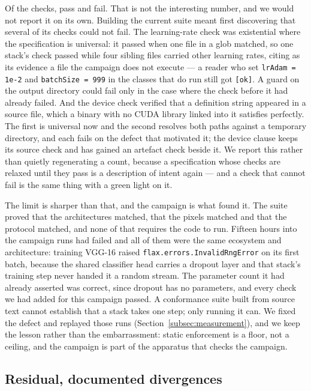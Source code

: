 Of the
\vConformanceChecks{} checks, \vConformancePassing{} pass and
\vConformanceFailing{} fail. That is not the interesting number, and we would
not report it on its own. Building the current suite meant first discovering
that several of its checks could not fail. The learning-rate check was
existential where the specification is universal: it passed when one file in a
glob matched, so one stack's check passed while four sibling files carried other
learning rates, citing as its evidence a file the campaign does not execute --- a
reader who set \texttt{lrAdam = 1e-2} and \texttt{batchSize = 999} in the
classes that do run still got \texttt{[ok]}. A guard on the output directory
could fail only in the case where the check before it had already failed. And the
device check verified that a definition string appeared in a source file, which a
binary with no CUDA library linked into it satisfies perfectly. The first is
universal now and the second resolves both paths against a temporary directory,
and each fails on the defect that motivated it; the device clause keeps its source
check and has gained an artefact check beside it. We report this
rather than quietly regenerating a count, because a specification whose checks
are relaxed until they pass is a description of intent again --- and a check that
cannot fail is the same thing with a green light on it.

The limit is sharper than that, and the campaign is what found it. The suite
proved that the architectures matched, that the pixels matched and that the
protocol matched, and none of that requires the code to run. Fifteen hours into
the campaign \vLateRuns{} runs had failed and all of them were the same
ecosystem and architecture: \vLateEcosystems{} training VGG-16 raised \texttt{flax.errors.InvalidRngError} on its first batch,
because the shared classifier head carries a dropout layer and that stack's
training step never handed it a random stream. The parameter count it had
already asserted was correct, since dropout has no parameters, and every check
we had added for this campaign passed. A conformance suite built from source text cannot
establish that a stack takes one step; only running it can. We fixed the defect
and replayed those runs (Section~\ref{subsec:measurement}), and we keep the
lesson rather than the embarrassment: static enforcement is a floor, not a
ceiling, and the campaign is part of the apparatus that checks the campaign.

\subsection{Residual, documented divergences}
\label{app:divergences}

